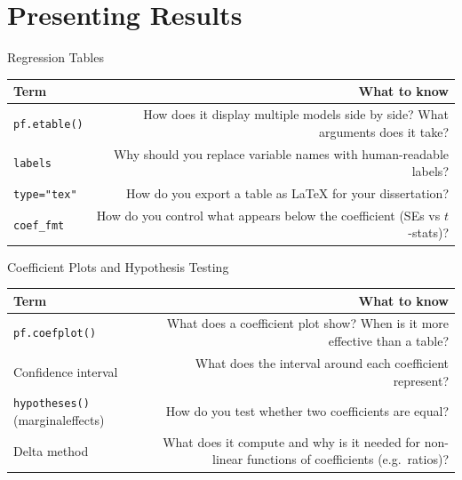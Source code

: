 \documentclass[9pt,aspectratio=169]{beamer}
\begin{document}
\section{Presenting Results}

\begin{frame}{Regression Tables}

\begin{tabular}{@{}lR@{}}
\toprule
\textbf{Term} & \textbf{What to know} \\
\midrule
\alert{\texttt{pf.etable()}} & How does it display multiple models side by side? What arguments does it take? \\[0.8em]
\alert{\texttt{labels}} & Why should you replace variable names with human-readable labels? \\[0.8em]
\alert{\texttt{type="tex"}} & How do you export a table as \LaTeX{} for your dissertation? \\[0.8em]
\alert{\texttt{coef\_fmt}} & How do you control what appears below the coefficient (SEs vs $t$-stats)? \\
\bottomrule
\end{tabular}

\end{frame}


\begin{frame}{Coefficient Plots and Hypothesis Testing}

\begin{tabular}{@{}lR@{}}
\toprule
\textbf{Term} & \textbf{What to know} \\
\midrule
\alert{\texttt{pf.coefplot()}} & What does a coefficient plot show? When is it more effective than a table? \\[0.8em]
\alert{Confidence interval} & What does the interval around each coefficient represent? \\[0.8em]
\alert{\texttt{hypotheses()} (marginaleffects)} & How do you test whether two coefficients are equal? \\[0.8em]
\alert{Delta method} & What does it compute and why is it needed for non-linear functions of coefficients (e.g.\ ratios)? \\
\bottomrule
\end{tabular}

\end{frame}
\end{document}
